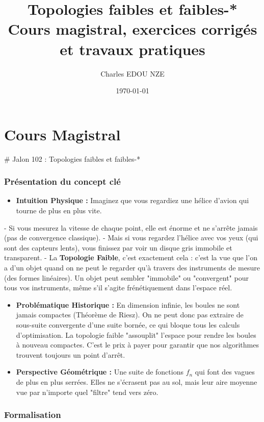 \documentclass[11pt,a4paper]{article}
\title{\Huge Topologies faibles et faibles-* \\ \large Cours magistral, exercices corrigés et travaux pratiques}
\author{\Large Charles EDOU NZE}
\date{\today}
\begin{document}
\maketitle
\tableofcontents
\newpage

\part{Cours Magistral}

\# Jalon 102 : Topologies faibles et faibles-*

\section{Présentation du concept clé}

\begin{itemize}
\item \textbf{Intuition Physique :} Imaginez que vous regardiez une hélice d'avion qui tourne de plus en plus vite.
\end{itemize}
    - Si vous mesurez la vitesse de chaque point, elle est énorme et ne s'arrête jamais (pas de convergence classique).
    - Mais si vous regardez l'hélice avec vos yeux (qui sont des capteurs lents), vous finissez par voir un disque gris immobile et transparent.
    - La \textbf{Topologie Faible}, c'est exactement cela : c'est la vue que l'on a d'un objet quand on ne peut le regarder qu'à travers des instruments de mesure (des formes linéaires). Un objet peut sembler "immobile" ou "convergent" pour tous vos instruments, même s'il s'agite frénétiquement dans l'espace réel.
\begin{itemize}
\item \textbf{Problématique Historique :} En dimension infinie, les boules ne sont jamais compactes (Théorème de Riesz). On ne peut donc pas extraire de sous-suite convergente d'une suite bornée, ce qui bloque tous les calculs d'optimisation. La topologie faible "assouplit" l'espace pour rendre les boules à nouveau compactes. C'est le prix à payer pour garantir que nos algorithmes trouvent toujours un point d'arrêt.
\item \textbf{Perspective Géométrique :} Une suite de fonctions $f_n$ qui font des vagues de plus en plus serrées. Elles ne s'écrasent pas au sol, mais leur aire moyenne vue par n'importe quel "filtre" tend vers zéro.

\end{itemize}
\section{Formalisation}
\end{document}
